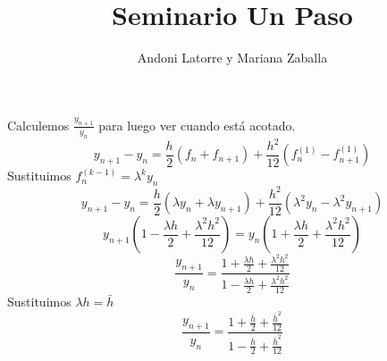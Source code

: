 \documentclass{article}
\title{Seminario Un Paso}
\author{Andoni Latorre y Mariana Zaballa}
\date{}
\begin{document}
\maketitle
Calculemos $\frac{y_{n+1}}{y_n}$ para luego ver cuando está acotado.
$$
y_{n+1} - y_n = \frac{h}{2}(f_n+f_{n+1}) + \frac{h^2}{12}(f_n^{(1)}-f_{n+1}^{(1)})
$$
Sustituimos $f^{(k-1)}_n = \lambda^k y_n $
$$
y_{n+1}-y_n = \frac{h}{2}(\lambda y_n+\lambda y_{n+1}) + \frac{h^2}{12}(\lambda^2y_n-\lambda^2 y_{n+1})
$$
$$
y_{n+1}(1 - \frac{\lambda h}{2} + \frac{\lambda^2 h^2}{12}) = y_n (1 + \frac{\lambda h}{2} + \frac{\lambda^2 h^2}{12})
$$
$$
\frac{y_{n+1}}{y_n} = \frac{1 + \frac{\lambda h}{2} + \frac{\lambda^2 h^2}{12}}{1 - \frac{\lambda h}{2} + \frac{\lambda^2 h^2}{12}}
$$
Sustituimos $\lambda h = \bar{h}$
$$
\frac{y_{n+1}}{y_n} = \frac{1 + \frac{\bar{h}}{2} + \frac{\bar{h}^2}{12}}{1 - \frac{\bar{h}}{2} + \frac{\bar{h}^2}{12}}
$$
\end{document}
